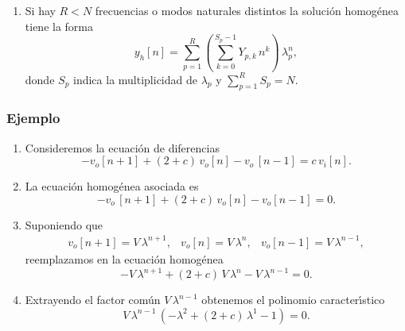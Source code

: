 \begin{enumerate}
\item Si hay $R<N$ frecuencias o modos naturales distintos la soluci\'{o}n homog\'{e}nea tiene la forma 
\begin{equation}
        y_{h}\left[ n\right] =\sum_{p=1}^{R}\left(\sum_{k=0}^{S_{p}-1}Y_{p,k} \, n^{k}\right) \, \lambda _{p}^n,
\end{equation}
donde $S_{p}$ indica la multiplicidad de $\lambda _{p}$ y $\sum_{p=1}^{R}S_{p}=N$.

\end{enumerate}

\subsubsection{Ejemplo}

\begin{enumerate}

\item Consideremos la ecuaci\'{o}n de diferencias
\begin{equation}
  -v_{o}\left[ n+1\right] +\left( 2+c\right) \, v_{o}\left[ n\right] -v_{o} \, \left[n-1\right] =
     c \, v_{i}\left[ n\right].
\end{equation}

\item La ecuaci\'{o}n homog\'{e}nea asociada es
\begin{equation}
  -v_{o} \, \left[ n+1\right] +\left( 2+c\right) \, v_{o}\left[ n\right] -v_{o}\left[n-1\right] = 0.
\end{equation}

\item Suponiendo que
\begin{equation}
  \begin{array}{ccc}
    v_{o}[n+1] = V \, \lambda^{n+1}, & v_{o}[n] = V \, \lambda^{n}, & v_{o}[n-1] = V \, \lambda^{n-1}, 
  \end{array}
\end{equation}
reemplazamos en la ecuaci\'{o}n homog\'{e}nea
\begin{equation}
  -V \, \lambda^{n+1} + (2 + c) \, V \, \lambda^{n} - V \, \lambda^{n-1} = 0. \label{ecdifhomuno}
\end{equation}

\item Extrayendo el factor com\'{u}n $V \, \lambda^{n-1}$ obtenemos el polinomio caracter\'{\i}stico
\begin{equation}
  V \, \lambda^{n-1} \, (-\lambda^{2} + (2 + c) \, \lambda^{1} - 1) = 0. \label{ecdifhomdos}
\end{equation}


\end{enumerate}
